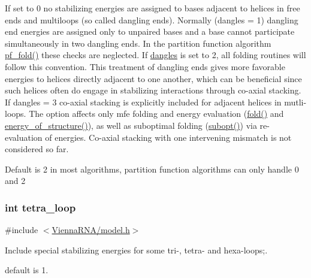 If set to 0 no stabilizing energies are assigned to bases adjacent to helices in free ends and multiloops (so called dangling ends). Normally (dangles = 1) dangling end energies are assigned only to unpaired bases and a base cannot participate simultaneously in two dangling ends. In the partition function algorithm \hyperlink{group__pf__fold_gadc3db3d98742427e7001a7fd36ef28c2}{pf\+\_\+fold()} these checks are neglected. If \hyperlink{group__model__details_ga72b511ed1201f7e23ec437e468790d74}{dangles} is set to 2, all folding routines will follow this convention. This treatment of dangling ends gives more favorable energies to helices directly adjacent to one another, which can be beneficial since such helices often do engage in stabilizing interactions through co-\/axial stacking.~\newline
If dangles = 3 co-\/axial stacking is explicitly included for adjacent helices in mutli-\/loops. The option affects only mfe folding and energy evaluation (\hyperlink{group__mfe__fold__single_gaadafcb0f140795ae62e5ca027e335a9b}{fold()} and \hyperlink{group__eval_gaf93986cb3cb29770ec9cca69c9fab8cf}{energy\+\_\+of\+\_\+structure()}), as well as suboptimal folding (\hyperlink{group__subopt__wuchty_ga700f662506a233e42dd7fda74fafd40e}{subopt()}) via re-\/evaluation of energies. Co-\/axial stacking with one intervening mismatch is not considered so far.

Default is 2 in most algorithms, partition function algorithms can only handle 0 and 2 \hypertarget{group__model__details_ga4f6265bdf0ead7ff4628a360adbfd77e}{}
\subsubsection[{tetra\+\_\+loop}]{\setlength{\rightskip}{0pt plus 5cm}int tetra\+\_\+loop}\label{group__model__details_ga4f6265bdf0ead7ff4628a360adbfd77e}


{\ttfamily \#include $<$\hyperlink{model_8h}{Vienna\+R\+N\+A/model.\+h}$>$}



Include special stabilizing energies for some tri-\/, tetra-\/ and hexa-\/loops;. 

default is 1. \hypertarget{group__model__details_ga097eccaabd6ae8b4fef83cccff85bb5d}{}
